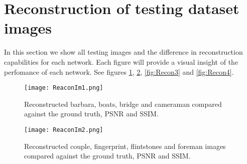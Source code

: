 \vspace{1.5cm}

\begin{table}[!htb]
\caption[Summary of SSIM for reconstructing networks]{Comparison of SSIM performance for each proposed network.}
\label{tab:summarySSIM}
\begin{center}
\end{center}
\end{table}

\FloatBarrier

\newpage

\section{Reconstruction of testing dataset images}
In this section we show all testing images and the difference in reconstruction capabilities for each network. Each figure will provide a visual insight of the perfomance of each network. See figures \ref{fig:Recon1}, \ref{fig:Recon2}, \ref{fig:Recon3} and \ref{fig:Recon4}.  


\begin{figure}[!htb]
\vspace{1cm}
\centering 
\texttt{[image: ReaconIm1.png]} 
\caption[Reconstructed testing images subset 1]{Reconstructed barbara, boats, bridge and cameraman compared against the ground truth, PSNR and SSIM.}
\label{fig:Recon1} 
\end{figure} 



\begin{figure}[!hb] 
\vspace{4.5cm}
\centering
\texttt{[image: ReaconIm2.png]} 
\caption[Reconstructed testing images subset 2]{Reconstructed couple, fingerprint, flintstones and foreman images compared against the ground truth, PSNR and SSIM.}
\label{fig:Recon2} 
\end{figure}  



